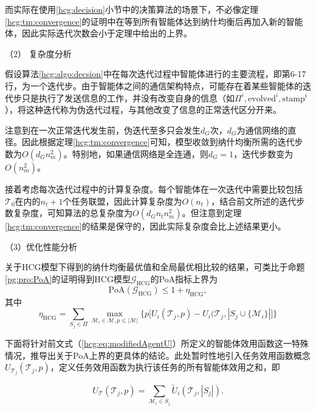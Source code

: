 而实际在使用\ref{hcg:decision}小节中的决策算法的场景下，不必像定理\ref{hcg:tm:convergence}的证明中在等到所有智能体达到纳什均衡后再加入新的智能体，因此实际迭代次数会小于定理中给出的上界。


%
（2） 复杂度分析

假设算法\ref{hcg:algo:decsion}中在每次迭代过程中智能体进行的主要流程，即第6-17行，为一个迭代步。由于智能体之间的通信架构特点，可能存在着某些智能体的迭代步只是执行了发送信息的工作，并没有改变自身的信息（如$\Pi^i,\text{evolved}^i,\text{stamp}^i$），将这种迭代称为伪迭代过程，与其他改变了信息的正常迭代区分开来。

注意到在一次正常迭代发生前，伪迭代至多只会发生$d_G$次，$d_G$为通信网络的直径。因此根据定理\ref{hcg:tm:convergence}可知，模型收敛到纳什均衡所需的迭代步数为$O(d_G n_m^2)$。特别地，如果通信网络是全连通，则$d_G=1$，迭代步数变为$O(n_m^2)$。

接着考虑每次迭代过程中的计算复杂度。每个智能体在一次迭代中需要比较包括$\mathcal{T}_0$在内的$n_t+1$个任务联盟，因此计算复杂度为$O(n_t)$，结合前文所述的迭代步数复杂度，可知算法的总复杂度为$O(d_G n_t n_m^2)$。但注意到定理\ref{hcg:tm:convergence}的结果是保守的，因此实际复杂度会比上述结果更小。



（3）优化性能分析

关于HCG模型下得到的纳什均衡最优值和全局最优相比较的结果，可类比于命题\ref{pg:pro:PoA}的证明得到HCG模型$\mathcal{G}_{\text{HCG}}$的PoA指标上界为
\begin{equation}
\label{hcg:eq:PoA}
	\mathrm{PoA}(\mathcal{G}_{\text{HCG}}) \leq 1+\eta_{\text{HCG}},
\end{equation}
其中
\begin{equation}
\label{hcg:eq:eta}
	\eta_{\text{HCG}} = \sum_{S_j \in \Pi} \max_{\mathcal{M}_i \in \mathcal{M},p\leq |\mathcal{M}|} \big\{p \big[U_i(\mathcal{T}_j,p) - U_i(\mathcal{T}_j,|S_j \cup\{\mathcal{M}_i\}| \big] \big\}
\end{equation}

下面将针对前文式（\ref{hcg:eq:modifiedAgentU}）所定义的智能体效用函数这一特殊情况，推导出关于PoA上界的更具体的结论。此处暂时性地引入任务效用函数概念$U_{\mathcal{T}_j}(\mathcal{T}_j,p)$，定义任务效用函数为执行该任务的所有智能体效用之和，即

\begin{equation}
\label{hcg:eq:taskU}
	U_{\mathcal{T}}(\mathcal{T}_j,p) = \sum_{\mathcal{M}_i \in S_j} \widetilde U_i(\mathcal{T}_j,|S_j|).
\end{equation}

